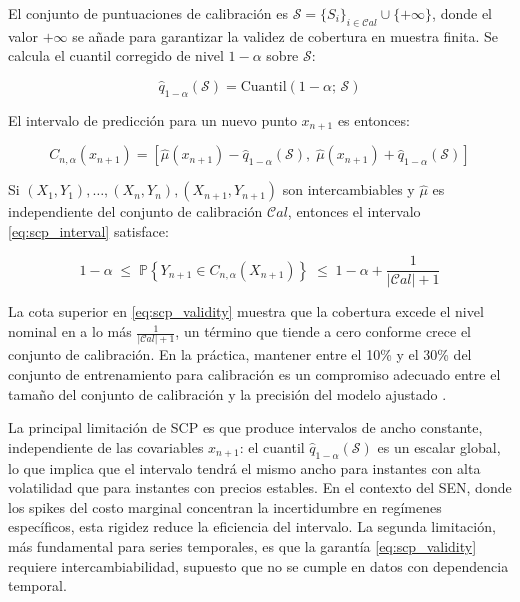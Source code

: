 El conjunto de puntuaciones de calibración es $\mathcal{S} = \{S_i\}_{i \in \mathcal{C}al} \cup \{+\infty\}$, donde el valor $+\infty$ se añade para garantizar la validez de cobertura en muestra finita. Se calcula el cuantil corregido de nivel $1 - \alpha$ sobre $\mathcal{S}$:

\begin{equation}
    \hat{q}_{1-\alpha}(\mathcal{S}) = \text{Cuantil}\!\left(1 - \alpha;\, \mathcal{S}\right)
    \label{eq:quantile_scp}
\end{equation}

El intervalo de predicción para un nuevo punto $x_{n+1}$ es entonces:

\begin{equation}
    C_{n,\alpha}(x_{n+1}) = \left[\hat{\mu}(x_{n+1}) - \hat{q}_{1-\alpha}(\mathcal{S}),\; \hat{\mu}(x_{n+1}) + \hat{q}_{1-\alpha}(\mathcal{S})\right]
    \label{eq:scp_interval}
\end{equation}

\begin{teorema}

Si $(X_1, Y_1), \ldots, (X_n, Y_n), (X_{n+1}, Y_{n+1})$ son intercambiables y $\hat{\mu}$ es independiente del conjunto de calibración $\mathcal{C}al$, entonces el intervalo \eqref{eq:scp_interval} satisface:

\begin{equation}
    1 - \alpha \;\leq\; \mathbb{P}\!\left\{Y_{n+1} \in C_{n,\alpha}(X_{n+1})\right\} \;\leq\; 1 - \alpha + \frac{1}{|\mathcal{C}al| + 1}
    \label{eq:scp_validity}
\end{equation}
\end{teorema}

La cota superior en \eqref{eq:scp_validity} muestra que la cobertura excede el nivel nominal en a lo más $\frac{1}{|\mathcal{C}al|+1}$, un término que tiende a cero conforme crece el conjunto de calibración. En la práctica, mantener entre el 10\% y el 30\% del conjunto de entrenamiento para calibración es un compromiso adecuado entre el tamaño del conjunto de calibración y la precisión del modelo ajustado \cite{ConformalPrediction}.

La principal limitación de SCP es que produce intervalos de ancho constante, independiente de las covariables $x_{n+1}$: el cuantil $\hat{q}_{1-\alpha}(\mathcal{S})$ es un escalar global, lo que implica que el intervalo tendrá el mismo ancho para instantes con alta volatilidad que para instantes con precios estables. En el contexto del SEN, donde los spikes del costo marginal concentran la incertidumbre en regímenes específicos, esta rigidez reduce la eficiencia del intervalo. La segunda limitación, más fundamental para series temporales, es que la garantía \eqref{eq:scp_validity} requiere intercambiabilidad, supuesto que no se cumple en datos con dependencia temporal.

